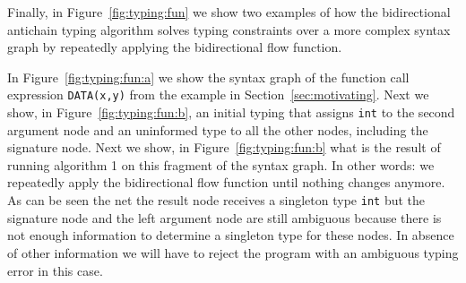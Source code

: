 \documentclass{sigplanconf}
\begin{document}
\begin{figure*}
{
 }
\caption{Two examples of the bidirectional antichain typing algorithm
  when run to completion for two different initial strengthenable
  typings.}\label{fig:typing:fun}
\end{figure*}
Finally, in Figure~\ref{fig:typing:fun} we show two examples of how
the bidirectional antichain typing algorithm solves typing constraints
over a more complex syntax graph by repeatedly applying the
bidirectional flow function.

In Figure~\ref{fig:typing:fun:a} we show the syntax graph of the
function call expression \verb+DATA(x,y)+ from the example in
Section~\ref{sec:motivating}. Next we show, in
Figure~\ref{fig:typing:fun:b}, an initial typing that assigns
\verb+int+ to the second argument node and an uninformed type to all
the other nodes, including the signature node. Next we show, in
Figure~\ref{fig:typing:fun:b} what is the result of running algorithm
1 on this fragment of the syntax graph. In other words: we repeatedly
apply the bidirectional flow function until nothing changes
anymore. As can be seen the net the result node receives a singleton
type \verb+int+ but the signature node and the left argument node are
still ambiguous because there is not enough information to determine a
singleton type for these nodes. In absence of other information we
will have to reject the program with an ambiguous typing error in this
case.
\end{document}
